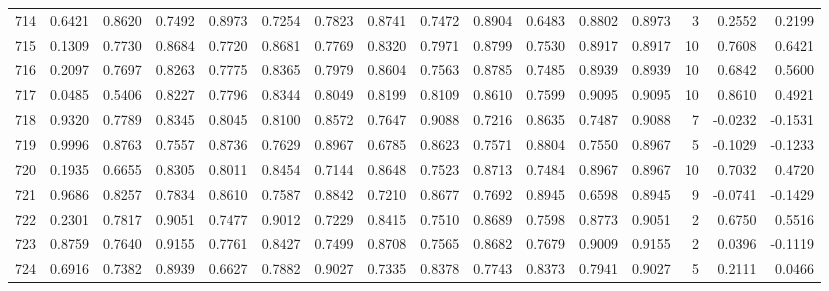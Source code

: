 \begin{tabular}{lrrrrrrrrrrrrrrr}
714 &      0.6421 &  0.8620 &  0.7492 &  0.8973 &  0.7254 &  0.7823 &  0.8741 &  0.7472 &  0.8904 &  0.6483 &   0.8802 &     0.8973 &      3 &                    0.2552 &                     0.2199 \\
715 &      0.1309 &  0.7730 &  0.8684 &  0.7720 &  0.8681 &  0.7769 &  0.8320 &  0.7971 &  0.8799 &  0.7530 &   0.8917 &     0.8917 &     10 &                    0.7608 &                     0.6421 \\
716 &      0.2097 &  0.7697 &  0.8263 &  0.7775 &  0.8365 &  0.7979 &  0.8604 &  0.7563 &  0.8785 &  0.7485 &   0.8939 &     0.8939 &     10 &                    0.6842 &                     0.5600 \\
717 &      0.0485 &  0.5406 &  0.8227 &  0.7796 &  0.8344 &  0.8049 &  0.8199 &  0.8109 &  0.8610 &  0.7599 &   0.9095 &     0.9095 &     10 &                    0.8610 &                     0.4921 \\
718 &      0.9320 &  0.7789 &  0.8345 &  0.8045 &  0.8100 &  0.8572 &  0.7647 &  0.9088 &  0.7216 &  0.8635 &   0.7487 &     0.9088 &      7 &                   -0.0232 &                    -0.1531 \\
719 &      0.9996 &  0.8763 &  0.7557 &  0.8736 &  0.7629 &  0.8967 &  0.6785 &  0.8623 &  0.7571 &  0.8804 &   0.7550 &     0.8967 &      5 &                   -0.1029 &                    -0.1233 \\
720 &      0.1935 &  0.6655 &  0.8305 &  0.8011 &  0.8454 &  0.7144 &  0.8648 &  0.7523 &  0.8713 &  0.7484 &   0.8967 &     0.8967 &     10 &                    0.7032 &                     0.4720 \\
721 &      0.9686 &  0.8257 &  0.7834 &  0.8610 &  0.7587 &  0.8842 &  0.7210 &  0.8677 &  0.7692 &  0.8945 &   0.6598 &     0.8945 &      9 &                   -0.0741 &                    -0.1429 \\
722 &      0.2301 &  0.7817 &  0.9051 &  0.7477 &  0.9012 &  0.7229 &  0.8415 &  0.7510 &  0.8689 &  0.7598 &   0.8773 &     0.9051 &      2 &                    0.6750 &                     0.5516 \\
723 &      0.8759 &  0.7640 &  0.9155 &  0.7761 &  0.8427 &  0.7499 &  0.8708 &  0.7565 &  0.8682 &  0.7679 &   0.9009 &     0.9155 &      2 &                    0.0396 &                    -0.1119 \\
724 &      0.6916 &  0.7382 &  0.8939 &  0.6627 &  0.7882 &  0.9027 &  0.7335 &  0.8378 &  0.7743 &  0.8373 &   0.7941 &     0.9027 &      5 &                    0.2111 &                     0.0466 \\

\end{tabular}

